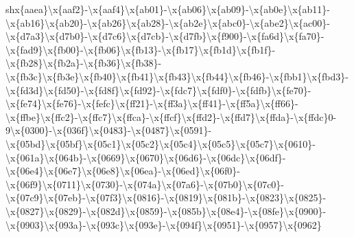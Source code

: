 \begin{DoxyCompactItemize}
sh{}x\{aaea\}\textbackslash{}x\{aaf2\}-\/\textbackslash{}x\{aaf4\}\textbackslash{}x\{ab01\}-\/\textbackslash{}x\{ab06\}\textbackslash{}x\{ab09\}-\/\textbackslash{}x\{ab0e\}\textbackslash{}x\{ab11\}-\/\textbackslash{}x\{ab16\}\textbackslash{}x\{ab20\}-\/\textbackslash{}x\{ab26\}\textbackslash{}x\{ab28\}-\/\textbackslash{}x\{ab2e\}\textbackslash{}x\{abc0\}-\/\textbackslash{}x\{abe2\}\textbackslash{}x\{ac00\}-\/\textbackslash{}x\{d7a3\}\textbackslash{}x\{d7b0\}-\/\textbackslash{}x\{d7c6\}\textbackslash{}x\{d7cb\}-\/\textbackslash{}x\{d7fb\}\textbackslash{}x\{f900\}-\/\textbackslash{}x\{fa6d\}\textbackslash{}x\{fa70\}-\/\textbackslash{}x\{fad9\}\textbackslash{}x\{fb00\}-\/\textbackslash{}x\{fb06\}\textbackslash{}x\{fb13\}-\/\textbackslash{}x\{fb17\}\textbackslash{}x\{fb1d\}\textbackslash{}x\{fb1f\}-\/\textbackslash{}x\{fb28\}\textbackslash{}x\{fb2a\}-\/\textbackslash{}x\{fb36\}\textbackslash{}x\{fb38\}-\/\textbackslash{}x\{fb3c\}\textbackslash{}x\{fb3e\}\textbackslash{}x\{fb40\}\textbackslash{}x\{fb41\}\textbackslash{}x\{fb43\}\textbackslash{}x\{fb44\}\textbackslash{}x\{fb46\}-\/\textbackslash{}x\{fbb1\}\textbackslash{}x\{fbd3\}-\/\textbackslash{}x\{fd3d\}\textbackslash{}x\{fd50\}-\/\textbackslash{}x\{fd8f\}\textbackslash{}x\{fd92\}-\/\textbackslash{}x\{fdc7\}\textbackslash{}x\{fdf0\}-\/\textbackslash{}x\{fdfb\}\textbackslash{}x\{fe70\}-\/\textbackslash{}x\{fe74\}\textbackslash{}x\{fe76\}-\/\textbackslash{}x\{fefc\}\textbackslash{}x\{ff21\}-\/\textbackslash{}x\{ff3a\}\textbackslash{}x\{ff41\}-\/\textbackslash{}x\{ff5a\}\textbackslash{}x\{ff66\}-\/\textbackslash{}x\{ffbe\}\textbackslash{}x\{ffc2\}-\/\textbackslash{}x\{ffc7\}\textbackslash{}x\{ffca\}-\/\textbackslash{}x\{ffcf\}\textbackslash{}x\{ffd2\}-\/\textbackslash{}x\{ffd7\}\textbackslash{}x\{ffda\}-\/\textbackslash{}x\{ffdc\}0-\/9\textbackslash{}x\{0300\}-\/\textbackslash{}x\{036f\}\textbackslash{}x\{0483\}-\/\textbackslash{}x\{0487\}\textbackslash{}x\{0591\}-\/\textbackslash{}x\{05bd\}\textbackslash{}x\{05bf\}\textbackslash{}x\{05c1\}\textbackslash{}x\{05c2\}\textbackslash{}x\{05c4\}\textbackslash{}x\{05c5\}\textbackslash{}x\{05c7\}\textbackslash{}x\{0610\}-\/\textbackslash{}x\{061a\}\textbackslash{}x\{064b\}-\/\textbackslash{}x\{0669\}\textbackslash{}x\{0670\}\textbackslash{}x\{06d6\}-\/\textbackslash{}x\{06dc\}\textbackslash{}x\{06df\}-\/\textbackslash{}x\{06e4\}\textbackslash{}x\{06e7\}\textbackslash{}x\{06e8\}\textbackslash{}x\{06ea\}-\/\textbackslash{}x\{06ed\}\textbackslash{}x\{06f0\}-\/\textbackslash{}x\{06f9\}\textbackslash{}x\{0711\}\textbackslash{}x\{0730\}-\/\textbackslash{}x\{074a\}\textbackslash{}x\{07a6\}-\/\textbackslash{}x\{07b0\}\textbackslash{}x\{07c0\}-\/\textbackslash{}x\{07c9\}\textbackslash{}x\{07eb\}-\/\textbackslash{}x\{07f3\}\textbackslash{}x\{0816\}-\/\textbackslash{}x\{0819\}\textbackslash{}x\{081b\}-\/\textbackslash{}x\{0823\}\textbackslash{}x\{0825\}-\/\textbackslash{}x\{0827\}\textbackslash{}x\{0829\}-\/\textbackslash{}x\{082d\}\textbackslash{}x\{0859\}-\/\textbackslash{}x\{085b\}\textbackslash{}x\{08e4\}-\/\textbackslash{}x\{08fe\}\textbackslash{}x\{0900\}-\/\textbackslash{}x\{0903\}\textbackslash{}x\{093a\}-\/\textbackslash{}x\{093c\}\textbackslash{}x\{093e\}-\/\textbackslash{}x\{094f\}\textbackslash{}x\{0951\}-\/\textbackslash{}x\{0957\}\textbackslash{}x\{0962\}\tex
\end{DoxyCompactItemize}
